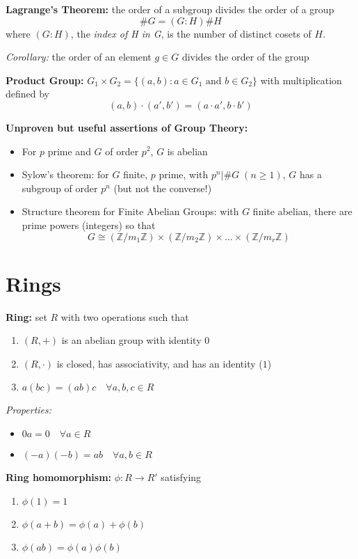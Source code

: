 \documentclass[12pt]{article}
\newcommand{\Z}{\mathbb{Z}}
\begin{document}
\textbf{Lagrange's Theorem:} the order of a subgroup divides the order of a group
\[\#G = (G:H)\#H\]
where $(G:H)$, the \emph{index of H in G}, is the number of distinct cosets of $H$. 

\emph{Corollary:} the order of an element $g \in G$ divides the order of the group 

\textbf{Product Group:} $G_1 \times G_2 = \{(a, b) : a\in G_1 \text{ and } b \in G_2\}$ with multiplication defined by 
\[(a, b) \cdot (a', b') = (a\cdot a', b\cdot b')\]

\textbf{Unproven but useful assertions of Group Theory:}
\begin{itemize}
    \item For $p$ prime and $G$ of order $p^2$, $G$ is abelian 
    \item Sylow's theorem: for $G$ finite, $p$ prime, with $p^n \bigg\vert \#G\; (n \geq 1)$, $G$ has a subgroup of order $p^n$ (but not the converse!)
    \item Structure theorem for Finite Abelian Groups: with $G$ finite abelian, there are prime powers (integers) so that 
    \[G \cong (\Z/m_1\Z) \times (\Z/m_2\Z) \times \dots \times (\Z/m_r\Z)\]
\end{itemize}

\section*{Rings}
\textbf{Ring:} set $R$ with two operations such that 
\begin{enumerate}
    \item $(R, +)$ is an abelian group with identity $0$
    \item $(R, \cdot)$ is closed, has associativity, and has an identity ($1$)
    \item $a (bc) = (ab)c \quad \forall a, b, c \in R$
\end{enumerate}

\emph{Properties:}
\begin{itemize}
    \item $0a = 0\quad \forall a \in R$
    \item $(-a)(-b) = ab \quad \forall a, b \in R$
\end{itemize}

\textbf{Ring homomorphism:} $\phi: R \to R'$ satisfying 
\begin{enumerate}
    \item $\phi(1) = 1$\\
    \item $\phi(a + b) = \phi(a) + \phi(b)$\\ 
    \item $\phi(ab) = \phi(a)\phi(b)$
\end{enumerate}
\end{document}
